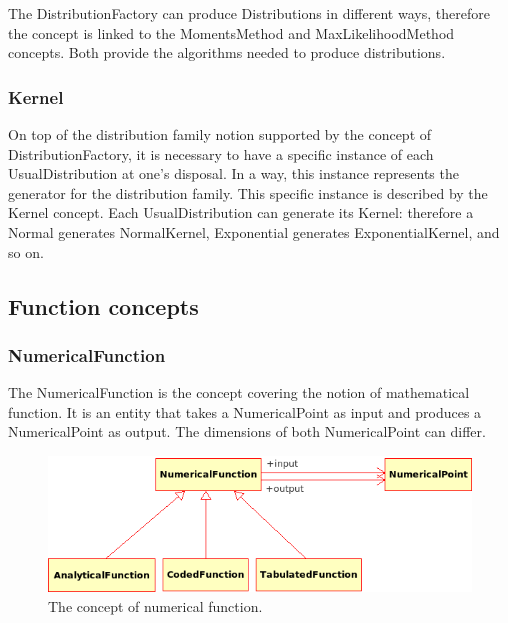 The DistributionFactory can produce Distributions in different ways, therefore the concept is linked to the MomentsMethod and MaxLikelihoodMethod concepts. Both provide the algorithms needed to produce distributions.

\subsubsection{Kernel}

On top of the distribution family notion supported by the concept of DistributionFactory, it is necessary to have a specific instance of each UsualDistribution at one's disposal. In a way, this instance represents the generator for the distribution family. This specific instance is described by the Kernel concept. Each UsualDistribution can generate its Kernel: therefore a Normal generates NormalKernel, Exponential generates ExponentialKernel, and so on.

\subsection{Function concepts}

\label{numericalfunction}\subsubsection{NumericalFunction}

The NumericalFunction is the concept covering the notion of mathematical function. It is an entity that takes a NumericalPoint as input and produces a NumericalPoint as output. The dimensions of both NumericalPoint can differ.

\begin{figure}[htb]
  \begin{center}
    \includegraphics[scale=0.6]{Figures/analysis/numerical_function.png}
    \caption{The concept of numerical function.}\label{fig:numerical_function}
  \end{center}
\end{figure}

